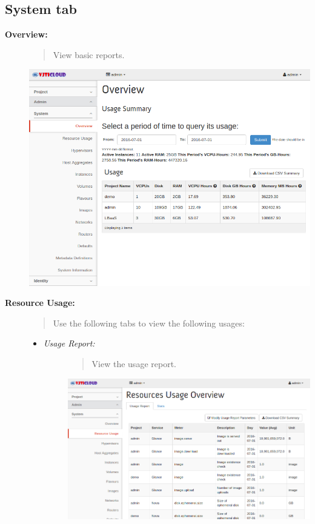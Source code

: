 \documentclass[letterpaper,10pt,english]{sphinxmanual}
\begin{document}
\subsection{System tab}
\label{_source/admin_guide/admin_tab:system-tab}\begin{description}
\item[{\textbf{Overview:}}] \leavevmode\begin{quote}

View basic reports.
\end{quote}

\includegraphics{sys_usage_overview.png}

\item[{\textbf{Resource Usage:}}] \leavevmode\begin{quote}

Use the following tabs to view the following usages:
\end{quote}
\begin{itemize}
\item {} \begin{description}
\item[{\emph{Usage Report:}}] \leavevmode\begin{quote}

View the usage report.
\end{quote}

\includegraphics{sys_resource_usage.png}


\end{description}
\end{itemize}
\end{description}
\end{document}

